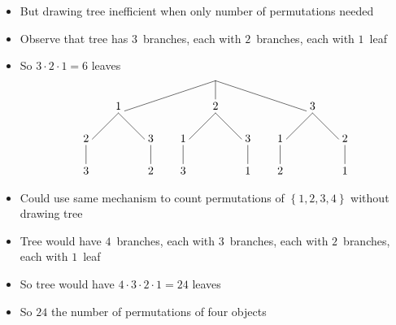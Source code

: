\documentclass[handout]{beamer}
\theoremstyle{definition}
\begin{document}
\begin{frame}
\begin{itemize}
\item But drawing tree inefficient when only
\alert{number} of permutations needed
\item Observe that tree has $3$~branches,
each with $2$~branches, each with $1$~leaf
\item So $3\cdot 2\cdot 1=6$ leaves
\[\begin{xy}<1cm,0cm>:
(0,0)="0";
(-3,-1)="-31";
(0,-1)="01";
(3,-1)="31";
"0";"-31"*+!D{1}**\dir{-};
"0";"01"*+!D{2}**\dir{-};
"0";"31"*+!D{3}**\dir{-};
"-31";(-4,-2)*+!D{2}**\dir{-};
(-4,-3)*+!D{3}**\dir{-};
"-31";(-2,-2)*+!D{3}**\dir{-};
(-2,-3)*+!D{2}**\dir{-};
"01";(-1,-2)*+!D{1}**\dir{-};
(-1,-3)*+!D{3}**\dir{-};
"01";(1,-2)*+!D{3}**\dir{-};
(1,-3)*+!D{1}**\dir{-};
"31";(2,-2)*+!D{1}**\dir{-};
(2,-3)*+!D{2}**\dir{-};
"31";(4,-2)*+!D{2}**\dir{-};
(4,-3)*+!D{1}**\dir{-};
\end{xy}\]
\item Could use same mechanism to count permutations
of $\left\{1,2,3,4\right\}$ without drawing tree
\item Tree would have $4$~branches, each with $3$~branches,
each with $2$~branches, each with $1$~leaf
\item So tree would have $4\cdot 3\cdot 2\cdot 1=24$ leaves
\item So $24$ the number of permutations of four objects
\end{itemize}
\end{frame}
\end{document}
